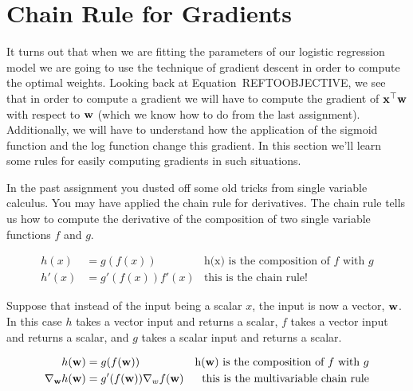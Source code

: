 \documentclass[assignment03_Solutions]{subfiles}
\begin{document}
\section{Chain Rule for Gradients}
It turns out that when we are fitting the parameters of our logistic regression model we are going to use the technique of gradient descent in order to compute the optimal weights.  Looking back at Equation~REFTOOBJECTIVE, we see that in order to compute a gradient we will have to compute the gradient of $\mathbf{x}^\top \mathbf{w}$ with respect to $\mathbf{w}$ (which we know how to do from the last assignment).  Additionally, we will have to understand how the application of the sigmoid function and the log function change this gradient.  In this section we'll learn some rules for easily computing gradients in such situations.

In the past assignment you dusted off some old tricks from single variable calculus.  You may have applied the chain rule for derivatives.  The chain rule tells us how to compute the derivative of the composition of two single variable functions $f$ and $g$.  

\begin{align}
h(x)&= g(f(x))&\mbox{h(x) is the composition of $f$ with $g$} \nonumber \\
h'(x) &= g'(f(x))f'(x)&\mbox{this is the chain rule!}
\end{align}

Suppose that instead of the input being a scalar $x$, the input is now a vector, $\mathbf{w}$.  In this case $h$ takes a vector input and returns a scalar, $f$ takes a vector input and returns a scalar, and $g$ takes a scalar input and returns a scalar.

\begin{align}
h(\mathbf{w}) &= g(f(\mathbf{w}))&\mbox{h($\mathbf{w}$) is the composition of $f$ with $g$} \nonumber \\
\nabla_{\mathbf{w}} h(\mathbf{w}) &= g'(f(\mathbf{w})) \nabla_w f(\mathbf{w}) & \mbox{this is the multivariable chain rule}
\end{align}
\end{document}
